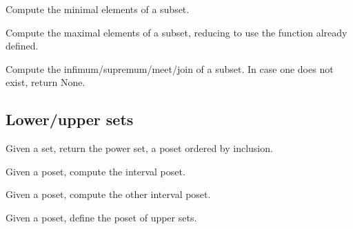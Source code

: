 \begin{gradedexercise}
Compute the minimal elements of a subset.


\end{gradedexercise}


\begin{gradedexercise}
Compute the maximal elements of a subset, reducing
to use the function  already defined.


\end{gradedexercise}


\begin{gradedexercise}
Compute the infimum/supremum/meet/join of a subset.
In case one does not exist, return None.


\end{gradedexercise}

\subsection{Lower/upper sets}
\begin{gradedexercise}
Given a set, return the power set, a poset ordered by inclusion.

\end{gradedexercise}


\begin{gradedexercise}
Given a poset, compute the interval poset.

\end{gradedexercise}


\begin{gradedexercise}
Given a poset, compute the other interval poset.

\end{gradedexercise}


\begin{gradedexercise}
Given a poset, define the poset of upper sets.

\end{gradedexercise}

